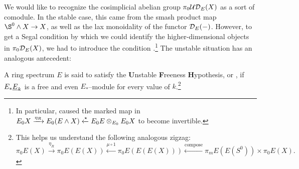 We would like to recognize the cosimplicial abelian group \(\pi_0 \mathcal{UD}_E(X)\) as a sort of comodule.  In the stable case, this came from the smash product map \(\S^0 \sm X \to X\), as well as the lax monoidality of the functor \(\mathcal{D}_E(-)\).  However, to get a Segal condition by which we could identify the higher-dimensional objects in \(\pi_0 \mathcal{D}_E(X)\), we had to introduce the condition .\footnote{In particular, {\FH} caused the marked map in \(E_0 X \xrightarrow{\eta_R} E_0(E \wedge X) \xleftarrow{\star} E_0 E \otimes_{E_0} E_0 X\) to become invertible.}  The unstable situation has an analogous antecedent:

\begin{definition}
A ring spectrum \(E\) is said to satisfy the \textbf{U}nstable \textbf{F}reeness \textbf{H}ypothesis, or \UFH, if \(E_* \underline{\smash{E}}_{k}\) is a free and even \(E_*\)--module for every value of \(k\).\footnote{This helps us understand the following analogous zigzag: \[\pi_0 E(X) \xrightarrow{\eta_R} \pi_0 E(E(X)) \xleftarrow{\mu \circ 1} \pi_0 E(E(E(X))) \xleftarrow{\mathrm{compose}} \pi_m E(E(S^0)) \times \pi_0 E(X).\]}
\end{definition}

